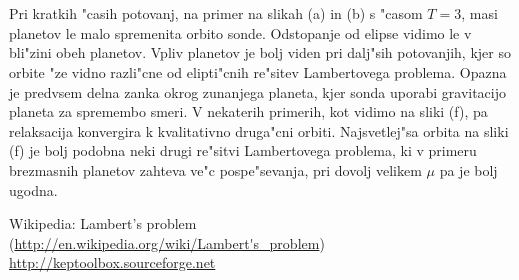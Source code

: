 \documentclass[a4paper,10pt]{article}
\begin{document}
\begin{figure}[H]
\centering
  \qquad\qquad
  \\
  \qquad\qquad
  \\
  \qquad\qquad
\end{figure}

Pri kratkih "casih potovanj, na primer na slikah (a) in (b) s "casom $T=3$, masi planetov le malo spremenita orbito sonde. Odstopanje od elipse vidimo le v bli"zini obeh planetov. Vpliv planetov je bolj viden pri dalj"sih potovanjih, kjer so orbite "ze vidno razli"cne od elipti"cnih re"sitev Lambertovega problema. Opazna je predvsem delna zanka okrog zunanjega planeta, kjer sonda uporabi gravitacijo planeta za spremembo smeri. V nekaterih primerih, kot vidimo na sliki (f), pa relaksacija konvergira k kvalitativno druga"cni orbiti. Najsvetlej"sa orbita na sliki (f) je bolj podobna neki drugi re"sitvi Lambertovega problema, ki v primeru brezmasnih planetov zahteva ve"c pospe"sevanja, pri dovolj velikem $\mu$ pa je bolj ugodna. 

\newpage
\begin{thebibliography}{3}
  Wikipedia: Lambert's problem (\url{http://en.wikipedia.org/wiki/Lambert's_problem})
  \url{http://keptoolbox.sourceforge.net}
\end{thebibliography}
\end{document}

